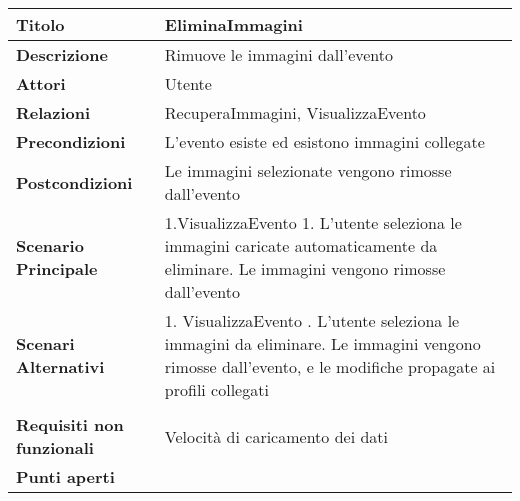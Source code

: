 \begin{tabular} {|P{4.5cm}|P{12.5cm}|}
  \hline
  \textbf{Titolo}                   & EliminaImmagini                                       \\
  \hline
  \textbf{Descrizione}              & Rimuove le immagini dall'evento                       \\
  \hline
  \textbf{Attori}                   & Utente                                                \\
  \hline
  \textbf{Relazioni}                & RecuperaImmagini, VisualizzaEvento                    \\
  \hline
  \textbf{Precondizioni}            & L'evento esiste ed esistono immagini collegate        \\
  \hline
  \textbf{Postcondizioni}           & Le immagini selezionate vengono rimosse dall'evento   \\
  \hline
  \textbf{Scenario Principale}      & 1.VisualizzaEvento
  1. L'utente seleziona le immagini caricate automaticamente da eliminare. Le immagini vengono rimosse dall'evento                                                \\
  \textbf{Scenari Alternativi}      & 1. VisualizzaEvento . L'utente seleziona le immagini da eliminare. Le immagini vengono rimosse dall'evento, e le modifiche propagate ai profili collegati \\                                                                                                                                                                                       \\
  \hline
  \textbf{Requisiti non funzionali} & Velocità di caricamento dei dati                      \\
  \hline
  \textbf{Punti aperti}             &                                                       \\
  \hline
\end{tabular}
\hfill
\break

